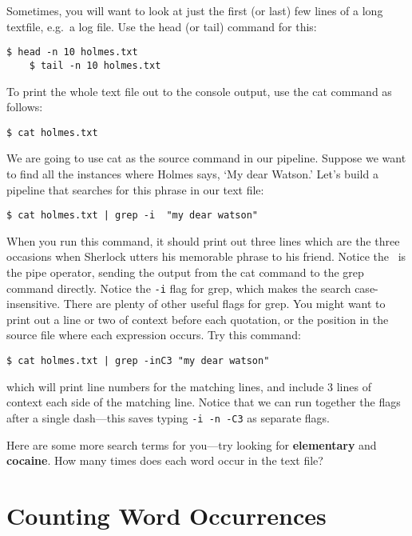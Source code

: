 \documentclass{article}
\begin{document}
Sometimes, you will want to look at just the first (or last) few lines of a long textfile, e.g.\ a log file. Use the head (or tail) command for this:

\begin{lstlisting}[style=BashInputStyle]
    $ head -n 10 holmes.txt
    $ tail -n 10 holmes.txt
\end{lstlisting}

To print the whole text file out to the console output, use the cat command as follows:

\begin{lstlisting}[style=BashInputStyle]
    $ cat holmes.txt
\end{lstlisting}

We are going to use cat as the source command in our pipeline. Suppose we want to find all the instances where Holmes says, `My dear Watson.' Let's build a pipeline that searches for this phrase in our text file:

\begin{lstlisting}[style=BashInputStyle]
    $ cat holmes.txt | grep -i  "my dear watson"
\end{lstlisting}

When you run this command, it should print out three lines which are the three occasions when Sherlock utters his memorable phrase to his friend. Notice the \textbar\ is the pipe operator, sending the output from the cat command to the grep command directly. Notice the \texttt{-i}  flag for grep, which makes the search case-insensitive.
There are plenty of other useful flags for grep. You might want to print out a line or two of context before each quotation, or the position in the source file where each expression occurs. Try this command:

\begin{lstlisting}[style=BashInputStyle]
    $ cat holmes.txt | grep -inC3 "my dear watson"
\end{lstlisting}

which will print line numbers for the matching lines, and include 3 lines of context each side of the matching line. Notice that we can run together the flags after a single dash---this saves typing \texttt{-i -n -C3} as separate flags.

Here are some more search terms for you---try looking for \textbf{elementary} and \textbf{cocaine}. How many times does each word occur in the text file?



\section*{Counting Word Occurrences}
\end{document}
